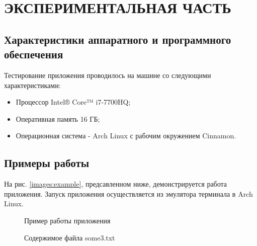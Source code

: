 \documentclass[a4paper,12pt]{article}
\begin{document}
\newpage
\section{ЭКСПЕРИМЕНТАЛЬНАЯ ЧАСТЬ}
\subsection{Характеристики аппаратного и программного обеспечения}
Тестирование приложения проводилось на машине со следующими характеристиками:\\
\begin{itemize}
\item Процессор Intel® Core™ i7-7700HQ;
\item Оперативная память 16 ГБ;
\item Операционная система - Arch Linux с рабочим окружением Cinnamon.
\end{itemize}

\newpage
\subsection{Примеры работы}
На рис. \ref{images:example}, предсавленном ниже, демонстрируется работа приложения. Запуск приложения осуществляется из эмулятора терминала в Arch Linux.
\begin{figure}[h]
\caption{Пример работы приложения}
\label{images:example1}
\end{figure}
\begin{figure}[h]
\caption{Содержимое файла some3.txt}
\label{images:example2}
\end{figure}
\end{document}
